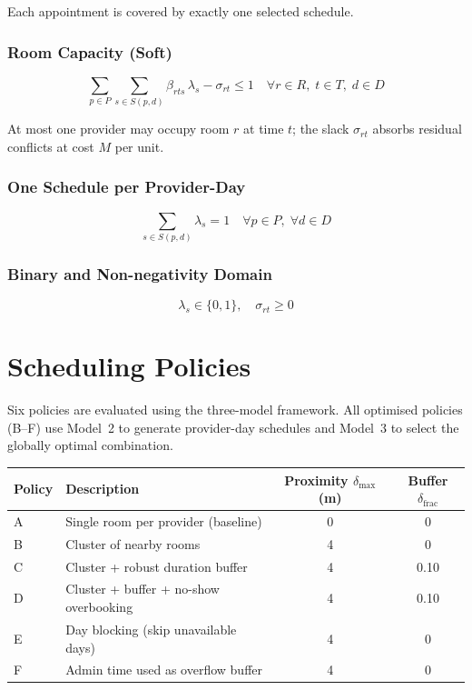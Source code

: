 \documentclass[12pt]{article}
\begin{document}
Each appointment is covered by exactly one selected schedule.

\subsubsection*{Room Capacity (Soft)}

\[
\sum_{p \in P} \sum_{s \in S(p,d)} \beta_{rts}\,\lambda_s - \sigma_{rt} \le 1
\quad \forall r \in R,\; t \in T,\; d \in D
\]

At most one provider may occupy room $r$ at time $t$; the slack $\sigma_{rt}$
absorbs residual conflicts at cost $M$ per unit.

\subsubsection*{One Schedule per Provider-Day}

\[
\sum_{s \in S(p,d)} \lambda_s = 1 \quad \forall p \in P,\; \forall d \in D
\]

\subsubsection*{Binary and Non-negativity Domain}

\[
\lambda_s \in \{0,1\}, \quad \sigma_{rt} \ge 0
\]

\newpage

\section{Scheduling Policies}

Six policies are evaluated using the three-model framework. All optimised policies (B--F)
use Model~2 to generate provider-day schedules and Model~3 to select the globally optimal
combination.

\begin{center}
\begin{tabular}{llcc}
\toprule
\textbf{Policy} & \textbf{Description} & \textbf{Proximity $\delta_{\max}$ (m)} & \textbf{Buffer $\delta_{\mathrm{frac}}$} \\
\midrule
A & Single room per provider (baseline)      & 0 & 0    \\
B & Cluster of nearby rooms                  & 4 & 0    \\
C & Cluster + robust duration buffer         & 4 & 0.10 \\
D & Cluster + buffer + no-show overbooking   & 4 & 0.10 \\
E & Day blocking (skip unavailable days)     & 4 & 0    \\
F & Admin time used as overflow buffer       & 4 & 0    \\
\bottomrule
\end{tabular}
\end{center}
\end{document}
